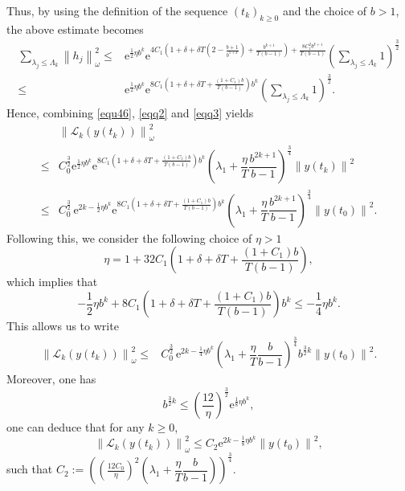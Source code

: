 \documentclass[sn-mathphys]{sn-jnl}
\begin{document}
Thus, by using the definition of the sequence $(t_k)_{k \geq 0}$ and the choice of $b>1$, the above estimate becomes
\begin{align}\label{eqq3}
    \sum_{\lambda_{j} \leq \Lambda_{k}} \left\|h_{j}\right\|_{\omega}^{2}
    \leq &\mathrm{e}^{\frac{1}{2}\eta b^k} \mathrm{e}^{4 C_1\left(1+\delta+ \delta T\left(2-\frac{b+1}{b^{1+k}}\right) + \frac{b^{k+1}}{T(b-1)}\right) + \frac{8 C_1^2 b^{k+1}}{T(b-1)}} \left(\sum_{\lambda_{j} \leq \Lambda_{k}} 1\right)^{\frac{3}{2}}\nonumber\\
    \leq &\mathrm{e}^{\frac{1}{2}\eta b^k} \mathrm{e}^{8 C_1\left(1+ \delta +\delta T + \frac{(1+C_1)b}{T(b-1)}\right)b^k}\left(\sum_{\lambda_{j} \leq \Lambda_{k}} 1\right)^{\frac{3}{2}}.
\end{align}
Hence, combining \eqref{equ46}, \eqref{eqq2} and \eqref{eqq3} yields
\begin{align}\label{eq48}
&\left\|\mathcal{L}_{k}\left(y\left(t_{k}\right)\right)\right\|_{\omega}^{2}\nonumber\\
\leq &C_0^{\frac{3}{2}}\mathrm{e}^{\frac{1}{2}\eta b^k} \mathrm{e}^{8 C_1\left(1+ \delta +\delta T + \frac{(1+C_1)b}{T(b-1)}\right)b^k}  \left(\lambda_1 + \dfrac{\eta}{T} \dfrac{b^{2k+1}}{b-1}\right)^{\frac{3}{4}} \left\|y\left(t_{k}\right)\right\|^{2}\nonumber\\
\leq &C_0^{\frac{3}{2}} \,\mathrm{e}^{2k- \frac{1}{2}\eta b^{k}} \mathrm{e}^{8 C_1\left(1+ \delta +\delta T + \frac{(1+C_1)b}{T(b-1)}\right)b^k} \left(\lambda_1 + \dfrac{\eta}{T} \dfrac{b^{2k+1}}{b-1}\right)^{\frac{3}{4}} \left\|y\left(t_{0}\right)\right\|^{2}.
\end{align}
Following this, we consider the following choice of $\eta >1$
\begin{equation*}
    \eta = 1+ 32 C_1 \left(1+ \delta +\delta T + \frac{(1+C_1)b}{T(b-1)}\right),
\end{equation*}
which implies that
\begin{equation*}
    -\frac{1}{2} \eta b^{ k}+8 C_1\left(1+ \delta +\delta T + \frac{(1+C_1)b}{T(b-1)}\right) b^k  \leq-\frac{1}{4} \eta b^{ k}.
\end{equation*}
This allows us to write
\begin{align*}
\left\|\mathcal{L}_{k}\left(y\left(t_{k}\right)\right)\right\|_{\omega}^{2}
\leq &C_0^{\frac{3}{2}} \,\mathrm{e}^{2k- \frac{1}{4}\eta b^{ k}}  \left(\lambda_{1}+\dfrac{\eta}{T}\dfrac{b}{b-1} \right)^{\frac{3}{4}} b^{\frac{3}{2}k} \left\|y\left(t_{0}\right)\right\|^{2}.
\end{align*}
Moreover, one has
\begin{equation*}
    b^{\frac{3}{2}k} \leq  \left( \frac{12}{\eta}\right)^{\frac{3}{2}} \mathrm{e}^{\frac{1}{8}\eta b^{k} },
\end{equation*}
one can deduce that for any $k\geq 0$,
\begin{equation}\label{ImpCont}
\left\|\mathcal{L}_{k}\left(y\left(t_{k}\right)\right)\right\|_{\omega}^{2}\leq C_{2}\mathrm{e}^{2k- \frac{1}{8}\eta b^{k}} \left\|y\left(t_{0}\right)\right\|^{2},
\end{equation}
such that $C_{2}:= \left( \left(\frac{12 C_0}{\eta}\right)^{2} \left(\lambda_{1}+\dfrac{\eta}{T}\dfrac{b}{b-1} \right)\right)^{\frac{3}{4}}.$
\end{document}
